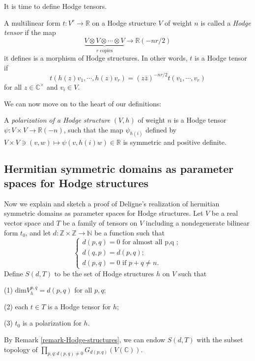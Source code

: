 It is time to define Hodge tensors. 

\begin{definition}
 \label{definition-Hodge-tensors}
 A multilinear form  $t:V^r \to \mathbb R$ on a Hodge structure $V$ of weight $n$ is called a {\it Hodge tensor} if the map
$$
\underbrace{V\otimes V \otimes \cdots \otimes V}_{r \text{ copies}} \to \mathbb R(-nr/2)
$$
it defines is a morphism of Hodge structures. In other words, $t$ is a Hodge tensor if 
$$
t(h(z)v_1,\cdots,h(z)v_r)=(z \bar z)^{-nr/2}t(v_1,\cdots,v_r)
$$
for all $z \in \mathbb C^\times$ and $v_i \in V$.
\end{definition}

We can now move on to the heart of our definitions:

\begin{definition}
\label{definition-polarization}
A {\it polarization of a Hodge structure} $(V,h)$ of weight $n$ is a Hodge tensor $\psi:V \times V \to \mathbb R(-n)$, such that the map $\psi_{h(i)}$ defined by $V \times V \ni (v,w) \mapsto \psi(v,h(i)w) \in \mathbb R$ is symmetric and positive definite. 
\end{definition}

\subsection{Hermitian symmetric domains as parameter spaces for Hodge structures}
 \label{subsection-Hermitian-for-Hodge}
Now we explain and sketch a proof of Deligne's realization of hermitian symmetric domains as parameter spaces for Hodge structures. Let $V$ be a real vector space and $T$ be a family of tensors on $V$ including a nondegenerate bilinear form $t_0$, and let $d: \mathbb Z \times \mathbb Z \to \mathbb N$ be a function such that 
$$
\begin{cases}
d(p,q)=0 \text{ for almost all p,q };\\ d(q,p)=d(p,q);\\ d(p,q) =0  \text{ if } p+q \ne n.
\end{cases}
$$
Define $S(d,T)$ to be the set of Hodge structures $h$ on $V$ such that 

(1) $\text{dim} V_h^{p,q} =d(p,q)$ for all $p,q$;

(2) each $t\in T$ is a Hodge tensor for $h$;

(3) $t_0$ is a polarization for $h$.

By Remark \ref{remark-Hodge-structures}, we can endow $S(d,T)$ with the subset topology of  $\prod_{p,q:d(p,q)\ne 0} G_{d(p,q)}(V(\mathbb C))$.  

